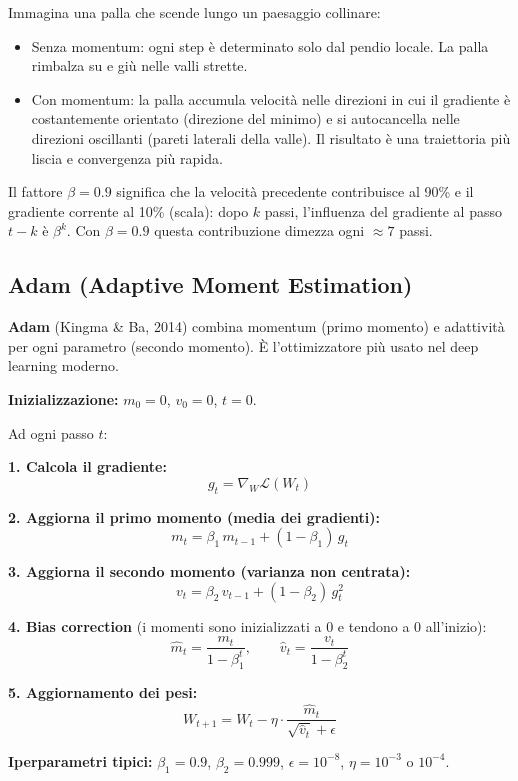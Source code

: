 \documentclass[
  11pt,
]{article}
\begin{document}
\begin{notabox}[title={\textbf{Intuizione: la palla che rotola in discesa}}]
Immagina una palla che scende lungo un paesaggio collinare:
\begin{itemize}
  \item Senza momentum: ogni step è determinato solo dal pendio locale. La palla rimbalza su e giù nelle valli strette.
  \item Con momentum: la palla accumula velocità nelle direzioni in cui il gradiente è costantemente orientato (direzione del minimo) e si autocancella nelle direzioni oscillanti (pareti laterali della valle). Il risultato è una traiettoria più liscia e convergenza più rapida.
\end{itemize}
Il fattore $\beta = 0.9$ significa che la velocità precedente contribuisce al 90\% e il gradiente corrente al 10\% (scala): dopo $k$ passi, l'influenza del gradiente al passo $t-k$ è $\beta^k$. Con $\beta=0.9$ questa contribuzione dimezza ogni $\approx 7$ passi.
\end{notabox}

\subsection{Adam (Adaptive Moment Estimation)}

\textbf{Adam} (Kingma \& Ba, 2014) combina momentum (primo momento) e adattività per ogni parametro (secondo momento). È l'ottimizzatore più usato nel deep learning moderno.

\begin{formulabox}[title={\textbf{Adam --- Algoritmo completo}}]
\textbf{Inizializzazione:} $m_0 = 0$, $v_0 = 0$, $t = 0$.

Ad ogni passo $t$:

\textbf{1. Calcola il gradiente:}
\[
g_t = \nabla_W \mathcal{L}(W_t)
\]

\textbf{2. Aggiorna il primo momento (media dei gradienti):}
\[
m_t = \beta_1\, m_{t-1} + (1 - \beta_1)\, g_t
\]

\textbf{3. Aggiorna il secondo momento (varianza non centrata):}
\[
v_t = \beta_2\, v_{t-1} + (1 - \beta_2)\, g_t^2
\]

\textbf{4. Bias correction} (i momenti sono inizializzati a 0 e tendono a 0 all'inizio):
\[
\hat{m}_t = \frac{m_t}{1 - \beta_1^t}, \qquad \hat{v}_t = \frac{v_t}{1 - \beta_2^t}
\]

\textbf{5. Aggiornamento dei pesi:}
\[
W_{t+1} = W_t - \eta \cdot \frac{\hat{m}_t}{\sqrt{\hat{v}_t} + \epsilon}
\]

\textbf{Iperparametri tipici:} $\beta_1 = 0.9$, $\beta_2 = 0.999$, $\epsilon = 10^{-8}$, $\eta = 10^{-3}$ o $10^{-4}$.
\end{formulabox}
\end{document}
